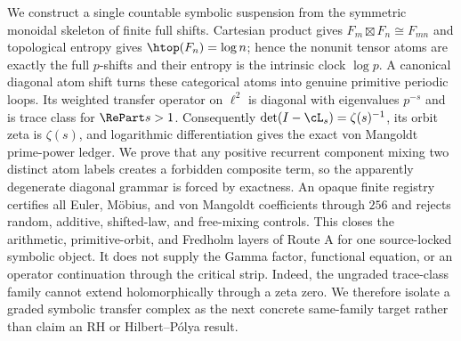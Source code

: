 We construct a single countable symbolic suspension from the symmetric
monoidal skeleton of finite full shifts.  Cartesian product gives
$F_m\boxtimes F_n\cong F_{mn}$ and topological entropy gives
$\htop(F_n)=\log n$; hence the nonunit tensor atoms are exactly the full
$p$-shifts and their entropy is the intrinsic clock $\log p$.  A canonical
diagonal atom shift turns these categorical atoms into genuine primitive
periodic loops.  Its weighted transfer operator on $\ell^2$ is diagonal with
eigenvalues $p^{-s}$ and is trace class for $\RePart s>1$.  Consequently
$\det(I-\cL_s)=\zeta(s)^{-1}$, its orbit zeta is $\zeta(s)$, and logarithmic
differentiation gives the exact von Mangoldt prime-power ledger.  We prove
that any positive recurrent component mixing two distinct atom labels creates
a forbidden composite term, so the apparently degenerate diagonal grammar is
forced by exactness.  An opaque finite registry certifies all Euler, M\"obius,
and von Mangoldt coefficients through $256$ and rejects random, additive,
shifted-law, and free-mixing controls.  This closes the arithmetic,
primitive-orbit, and Fredholm layers of Route A for one source-locked symbolic
object.  It does not supply the Gamma factor, functional equation, or an
operator continuation through the critical strip.  Indeed, the ungraded
trace-class family cannot extend holomorphically through a zeta zero.  We
therefore isolate a graded symbolic transfer complex as the next concrete
same-family target rather than claim an RH or Hilbert--P\'olya result.
